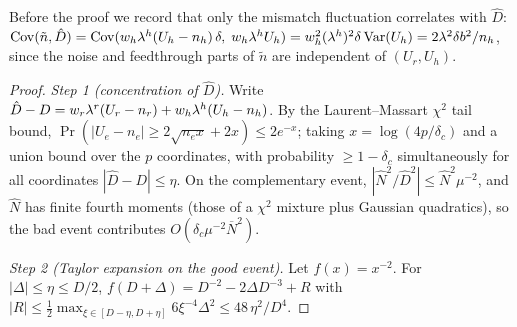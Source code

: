 Before the proof we record that only the mismatch fluctuation correlates with $\hat D$: $\mathrm{Cov}(\tilde n, \hat D) = \mathrm{Cov}(w_h \lambda^h (U_h - n_h)\,\delta,\; w_h \lambda^h U_h) = w_h^2 (\lambda^h)^2 \delta\, \mathrm{Var}(U_h) = 2\lambda^2\delta b^2/n_h$, since the noise and feedthrough parts of $\tilde n$ are independent of $(U_r, U_h)$.

\begin{proof}
\emph{Step 1 (concentration of $\hat D$).}
Write $\hat D - D = w_r \lambda^r (U_r - n_r) + w_h \lambda^h (U_h - n_h)$.
By the Laurent--Massart $\chi^2$ tail bound, $\Pr(|U_e - n_e| \ge 2\sqrt{n_e x} + 2x) \le 2e^{-x}$; taking $x = \log(4p/\delta_c)$ and a union bound over the $p$ coordinates, with probability $\ge 1 - \delta_c$ simultaneously for all coordinates $|\hat D - D| \le \eta$.
On the complementary event, $|\hat N^2/\hat D^2| \le \hat N^2 \mu^{-2}$, and $\hat N$ has finite fourth moments (those of a $\chi^2$ mixture plus Gaussian quadratics), so the bad event contributes $O(\delta_c \mu^{-2} \overline{N}^2)$.

\emph{Step 2 (Taylor expansion on the good event).}
Let $f(x) = x^{-2}$. For $|\Delta| \le \eta \le D/2$,
$f(D + \Delta) = D^{-2} - 2\Delta D^{-3} + R$ with
$|R| \le \tfrac{1}{2}\max_{\xi \in [D-\eta, D+\eta]} 6\xi^{-4}\Delta^2 \le 48\,\eta^2/D^4$.


\end{proof}
